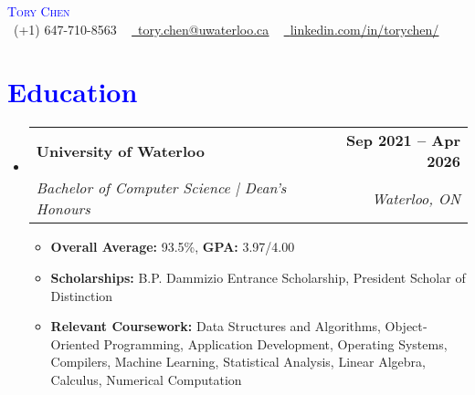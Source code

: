 \documentclass[letterpaper,11pt]{article}
\makeatletter
\newcommand{\resumeItem}[1]{
  \item\small{
    {#1 \vspace{-3pt}}
  }
}
\newcommand{\resumeSubheading}[4]{
  \vspace{-2pt}\item
    \begin{tabular*}{1.0\textwidth}[t]{l@{\extracolsep{\fill}}r}
      \textbf{#1} & \textbf{\small #2} \\
      \textit{\small#3} & \textit{\small #4} \\
    \end{tabular*}\vspace{-7pt}
}
\newcommand{\resumeSubHeadingListStart}{\begin{itemize}[leftmargin=0.0in, label={}]}
\newcommand{\resumeSubHeadingListEnd}{\end{itemize}}
\newcommand{\resumeItemListStart}{\begin{itemize}[leftmargin=0.2in]}
\newcommand{\resumeItemListEnd}{\end{itemize}\vspace{-5pt}}
\makeatother
\begin{document}
\begin{center}
    \textcolor{Blue}{\Huge \scshape Tory Chen} \\ \vspace{1pt}
    \small \raisebox{-0.1\height}\faPhone\ (+1) 647-710-8563 ~ \href{mailto:tory.chen@uwaterloo.ca}{\raisebox{-0.2\height}\faEnvelope\  \underline{tory.chen@uwaterloo.ca}} ~ 
    \href{https://www.linkedin.com/in/torychen/}{\raisebox{-0.2\height}\faLinkedin\ \underline{linkedin.com/in/torychen/}}  ~
    \vspace{-8pt}
\end{center}


\section{\textcolor{Blue}{Education}}
  \resumeSubHeadingListStart
    \resumeSubheading
          {\textcolor{NavyBlue}{University of Waterloo}}{Sep 2021 -- Apr 2026}
      {Bachelor of Computer Science | Dean's Honours}{Waterloo, ON}
      \resumeItemListStart
        \resumeItem{\textbf{\textcolor{NavyBlue}{Overall Average:}} 93.5\%, \textbf{\textcolor{NavyBlue}{GPA:}} 3.97/4.00}
        \resumeItem{\textbf{\textcolor{NavyBlue}{Scholarships:}} B.P. Dammizio Entrance Scholarship, President Scholar of Distinction}
        \resumeItem{\textbf{\textcolor{NavyBlue}{Relevant Coursework:}} Data Structures and Algorithms, Object‐Oriented Programming, Application Development, Operating Systems, Compilers, Machine Learning, Statistical Analysis, Linear Algebra, Calculus, Numerical Computation}
      \resumeItemListEnd 
  \resumeSubHeadingListEnd
\vspace{-15pt}
\end{document}
